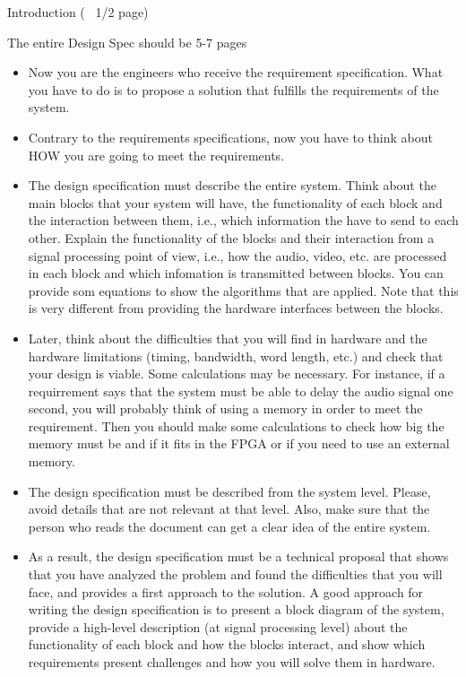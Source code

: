 Introduction (~ 1/2 page)

The entire Design Spec should be 5-7 pages

\begin{itemize}
\item Now you are the engineers who receive the requirement specification. What you have to do is to propose a solution that fulfills the requirements of the system.
\item Contrary to the requirements specifications, now you have to think about HOW you are going to meet  the requirements.
\item The design specification must describe the entire system. Think about the main blocks that your system will have, the functionality of each block and the interaction between them, i.e., which information the have to send to each other. Explain the functionality of the blocks and their interaction from a signal processing point of view, i.e., how the audio, video, etc. are processed in each block and which infomation is transmitted between blocks. You can provide som equations to show the algorithms that are applied. Note that this is very different from providing the hardware interfaces between the blocks.
\item Later, think about the difficulties that you will find in hardware and the hardware limitations (timing, bandwidth, word length, etc.) and check that your design is viable. Some calculations may be necessary. For instance, if a requirrement says that the system must be able to delay the audio signal one second, you will probably think of using a memory in order to meet the requirement. Then you should make some calculations to check how big the memory must be and if it fits in the FPGA or if you need to use an external memory.
\item The design specification must be described from the system level. Please, avoid details that are not relevant at that level. Also, make sure that the person who reads the document can get a clear idea of the entire system.
\item As a result, the design specification must be a technical proposal that shows that you have analyzed the problem and found the difficulties that you will face, and provides a first approach to the solution. A good approach for writing the design specification is to present a block diagram of the system, provide a high-level description (at signal processing level) about the functionality of each block and how the blocks interact, and show which requirements present challenges and how you will solve them in hardware.
\end{itemize}
